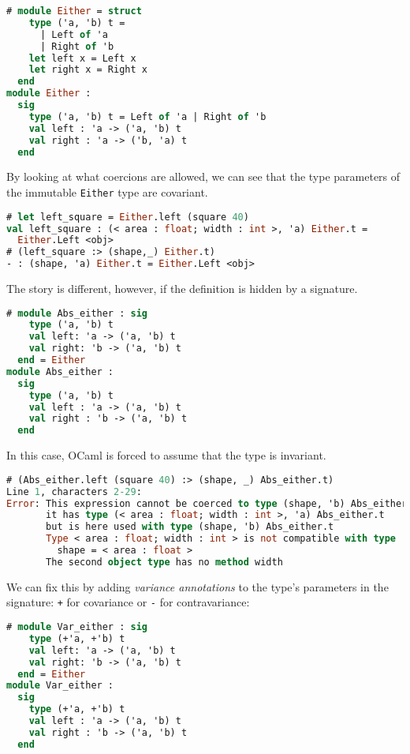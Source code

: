 \begin{lstlisting}[language=Caml]
# module Either = struct
    type ('a, 'b) t =
      | Left of 'a
      | Right of 'b
    let left x = Left x
    let right x = Right x
  end
module Either :
  sig
    type ('a, 'b) t = Left of 'a | Right of 'b
    val left : 'a -> ('a, 'b) t
    val right : 'a -> ('b, 'a) t
  end
\end{lstlisting}

By looking at what coercions are allowed, we can see that the type
parameters of the immutable \passthrough{\lstinline!Either!} type are
covariant.

\begin{lstlisting}[language=Caml]
# let left_square = Either.left (square 40)
val left_square : (< area : float; width : int >, 'a) Either.t =
  Either.Left <obj>
# (left_square :> (shape,_) Either.t)
- : (shape, 'a) Either.t = Either.Left <obj>
\end{lstlisting}

The story is different, however, if the definition is hidden by a
signature.

\begin{lstlisting}[language=Caml]
# module Abs_either : sig
    type ('a, 'b) t
    val left: 'a -> ('a, 'b) t
    val right: 'b -> ('a, 'b) t
  end = Either
module Abs_either :
  sig
    type ('a, 'b) t
    val left : 'a -> ('a, 'b) t
    val right : 'b -> ('a, 'b) t
  end
\end{lstlisting}

In this case, OCaml is forced to assume that the type is invariant.

\begin{lstlisting}[language=Caml]
# (Abs_either.left (square 40) :> (shape, _) Abs_either.t)
Line 1, characters 2-29:
Error: This expression cannot be coerced to type (shape, 'b) Abs_either.t;
       it has type (< area : float; width : int >, 'a) Abs_either.t
       but is here used with type (shape, 'b) Abs_either.t
       Type < area : float; width : int > is not compatible with type
         shape = < area : float >
       The second object type has no method width
\end{lstlisting}

We can fix this by adding \emph{variance annotations} to the type's
parameters in the signature: \passthrough{\lstinline!+!} for covariance
or \passthrough{\lstinline!-!} for contravariance:

\begin{lstlisting}[language=Caml]
# module Var_either : sig
    type (+'a, +'b) t
    val left: 'a -> ('a, 'b) t
    val right: 'b -> ('a, 'b) t
  end = Either
module Var_either :
  sig
    type (+'a, +'b) t
    val left : 'a -> ('a, 'b) t
    val right : 'b -> ('a, 'b) t
  end
\end{lstlisting}

